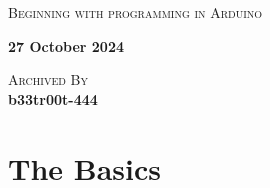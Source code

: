 \documentclass{article}
\begin{document}
	\begin{titlepage}
		\begin{center}
			\Huge\textsc{Beginning with programming in Arduino}
			
			\vfill
			
			\huge\textbf{27 October 2024}
			
			\vfill
			
			\Large\textsc{Archived By}\\
			\Large\textbf{b33tr00t-444}
		\end{center}
	\end{titlepage}

\pagestyle{plain}

\tableofcontents

\pagebreak

\listoffigures

\pagebreak

\lstlistoflistings

\pagebreak

\section{The Basics}
\pagestyle{fancy}
\setcounter{page}{1}
\paragraph{}
\end{document}
